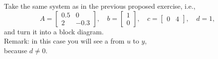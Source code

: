 \begin{frame}
{\begin{center}
           \end{center}}
\end{frame}

\begin{frame}
\myPause
 Take the same system as in the previous proposed exercise, i.e.,
 \begin{displaymath}
  A = \begin{bmatrix} 0.5 & 0 \\ 2 & -0.3 \end{bmatrix}, \quad
  b = \begin{bmatrix} 1 \\ 0 \end{bmatrix}, \quad
  c = \begin{bmatrix} 0 & 4 \end{bmatrix}, \quad
  d = 1,
 \end{displaymath}
 and turn it into a block diagram.\\ \myPause
 \vspace{5mm}Remark: in this case you will see a  from $u$ to $y$,\\
 because $d \neq 0$. 
\end{frame}

